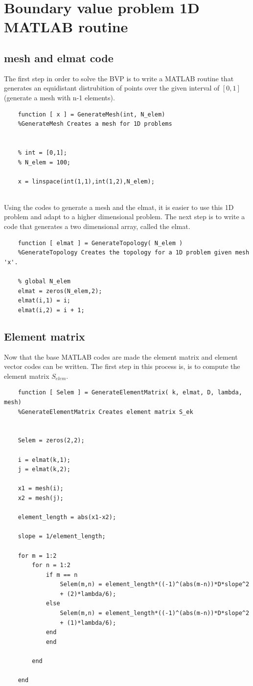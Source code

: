 \documentclass[a4paper]{report}
\begin{document}
\section{Boundary value problem 1D MATLAB routine}

\subsection{mesh and elmat code}
The first step in order to solve the BVP is to write a MATLAB routine that generates an equidistant distrubition of points over the given interval of $[0,1]$(generate a mesh with n-1 elements).

\begin{lstlisting}
	function [ x ] = GenerateMesh(int, N_elem)
	%GenerateMesh Creates a mesh for 1D problems
	
	
	% int = [0,1];
	% N_elem = 100;
	
	x = linspace(int(1,1),int(1,2),N_elem);
	
\end{lstlisting}
	
Using the codes to generate a mesh and the elmat, it is easier to use this 1D problem and adapt to a higher dimensional problem. The next step is to write a code that generates a two dimensional array, called the elmat.

\begin{lstlisting}
	function [ elmat ] = GenerateTopology( N_elem )
	%GenerateTopology Creates the topology for a 1D problem given mesh 'x'.
	
	% global N_elem
	elmat = zeros(N_elem,2);
	elmat(i,1) = i;
	elmat(i,2) = i + 1;

\end{lstlisting}

\subsection{Element matrix}

Now that the base MATLAB codes are made the element matrix and element vector codes can be written. The first step in this process is, is to compute the element matrix $S_{elem}$.

\begin{lstlisting}
	function [ Selem ] = GenerateElementMatrix( k, elmat, D, lambda, mesh)
	%GenerateElementMatrix Creates element matrix S_ek
	
	
	Selem = zeros(2,2);
	
	i = elmat(k,1);
	j = elmat(k,2);
	
	x1 = mesh(i);
	x2 = mesh(j);
	
	element_length = abs(x1-x2);
	
	slope = 1/element_length; 
	
	for m = 1:2
		for n = 1:2
			if m == n
				Selem(m,n) = element_length*((-1)^(abs(m-n))*D*slope^2
				+ (2)*lambda/6);
			else
				Selem(m,n) = element_length*((-1)^(abs(m-n))*D*slope^2
				+ (1)*lambda/6);
			end
			end
	
		end
	
	end
\end{lstlisting}
\end{document}
